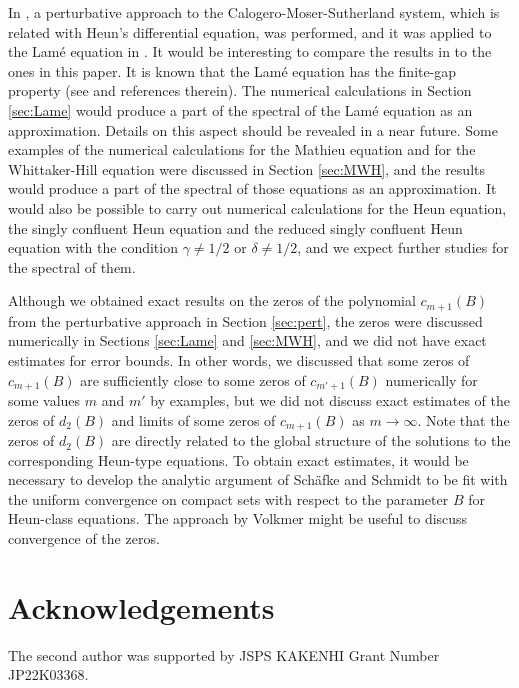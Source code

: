 \documentclass[12pt]{amsart}
\numberwithin{equation}{section}
\theoremstyle{definition}
\theoremstyle{remark}
\begin{document}
In \cite{Tak2}, a perturbative approach to the Calogero-Moser-Sutherland system, which is related with Heun's differential equation, was performed, and it was applied to the Lam\'e equation in \cite{TakL}.
It would be interesting to compare the results in \cite{Tak2,TakL} to the ones in this paper.
It is known that the Lam\'e equation has the finite-gap property (see \cite{TakS} and references therein).
The numerical calculations in Section \ref{sec:Lame} would produce a part of the spectral of the Lam\'e equation as an approximation.
Details on this aspect should be revealed in a near future.
Some examples of the numerical calculations for the Mathieu equation and for the Whittaker-Hill equation were discussed in Section \ref{sec:MWH}, and the results would produce a part of the spectral of those equations as an approximation.
It would also be possible to carry out numerical calculations for the Heun equation, the singly confluent Heun equation and the reduced singly confluent Heun equation with the condition $\gamma \neq 1/2$ or $\delta \neq 1/2$, and we expect further studies for the spectral of them.

Although we obtained exact results on the zeros of the polynomial $c_{m+1} (B)$ from the perturbative approach in Section \ref{sec:pert}, the zeros were discussed numerically in Sections \ref{sec:Lame} and \ref{sec:MWH}, and we did not have exact estimates for error bounds.
In other words, we discussed that some zeros of $c_{m+1} (B)$ are sufficiently close to some zeros of $c_{m'+1} (B)$ numerically for some values $m$ and $m'$ by examples, but we did not discuss exact estimates of the zeros of $d_2(B)$ and limits of some zeros of $c_{m+1} (B)$ as $m \to \infty $.
Note that the zeros of $d_2(B)$ are directly related to the global structure of the solutions to the corresponding Heun-type equations.
To obtain exact estimates, it would be necessary to develop the analytic argument of Sch{\"a}fke and Schmidt \cite{SS} to be fit with the uniform convergence on compact sets with respect to the parameter $B$ for Heun-class equations.
The approach by Volkmer \cite{Vol} might be useful to discuss convergence of the zeros.

\section*{Acknowledgements}
The second author was supported by JSPS KAKENHI Grant Number JP22K03368.
\end{document}
